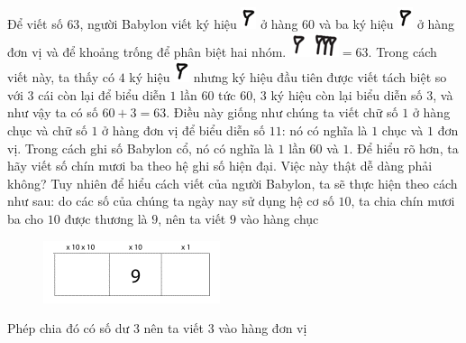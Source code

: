 \begin{multicols}{2}
\begin{figure}[H]
		\vspace*{-15pt}
	\end{figure}
	Để viết số $63$, người Babylon viết ký hiệu  \includegraphics[scale=0.7]{15}  ở hàng $60$ và ba ký hiệu \includegraphics[scale=0.7]{15}  ở hàng đơn vị và để khoảng trống để phân biệt hai nhóm.
	\vskip 0.1cm
	\includegraphics[scale=0.7]{16.1}$=63$. Trong cách viết này, ta thấy có $4$ ký hiệu \includegraphics[scale=0.7]{15}   nhưng ký hiệu đầu tiên được viết tách biệt so với $3$ cái còn lại để biểu diễn $1$ lần $60$ tức $60$, $3$ ký hiệu còn lại biểu diễn số $3$, và như vậy ta có số $60+3 =63$.
	\vskip 0.1cm
	Điều này giống như chúng ta viết chữ số $1$ ở hàng chục và chữ số $1$ ở hàng đơn vị để biểu diễn số $11$: nó có nghĩa là $1$ chục và $1$ đơn vị. Trong  cách ghi số  Babylon cổ, nó có nghĩa là $1$ lần $60$  và $1$.
	\vskip 0.1cm
	Để hiểu rõ hơn, ta hãy viết số chín mươi ba theo hệ ghi số hiện đại. Việc này thật dễ dàng phải không? Tuy nhiên để hiểu cách viết của người Babylon, ta sẽ thực hiện theo cách như sau: do các số của chúng ta ngày nay sử dụng hệ cơ số $10$, ta chia chín mươi ba cho $10$ được thương là $9$, nên ta viết $9$ vào hàng chục
	\begin{figure}[H]
		\centering
		\vspace*{-5pt}
		\captionsetup{labelformat= empty, justification=centering}
		\includegraphics[width=0.65\linewidth]{19}
		\vspace*{-10pt}
	\end{figure}
	Phép chia đó có số dư $3$ nên ta viết $3$ vào hàng đơn vị
	\begin{figure}[H]
		\centering
		\vspace*{-5pt}
		\captionsetup{labelformat= empty, justification=centering}

\end{figure}
\end{multicols}
